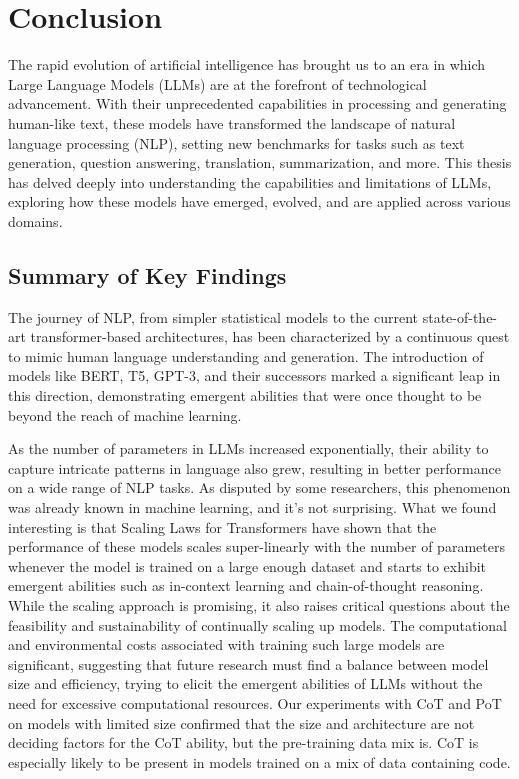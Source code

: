 
\section{Conclusion}
The rapid evolution of artificial intelligence has brought us to an era in which Large Language Models (LLMs) are at the forefront of technological advancement.
With their unprecedented capabilities in processing and generating human-like text, these models have transformed the landscape of natural language processing (NLP), setting new benchmarks for tasks such as text generation, question answering, translation, summarization, and more.
This thesis has delved deeply into understanding the capabilities and limitations of LLMs, exploring how these models have emerged, evolved, and are applied across various domains.

\subsection*{Summary of Key Findings}
The journey of NLP, from simpler statistical models to the current state-of-the-art transformer-based architectures, has been characterized by a continuous quest to mimic human language understanding and generation.
The introduction of models like BERT, T5, GPT-3, and their successors marked a significant leap in this direction, demonstrating emergent abilities that were once thought to be beyond the reach of machine learning.

As the number of parameters in LLMs increased exponentially, their ability to capture intricate patterns in language also grew, resulting in better performance on a wide range of NLP tasks.
As disputed by some researchers, this phenomenon was already known in machine learning, and it's not surprising.
What we found interesting is that Scaling Laws for Transformers have shown that the performance of these models scales super-linearly with the number of parameters whenever the model is trained on a large enough dataset and starts to exhibit emergent abilities such as in-context learning and chain-of-thought reasoning.
While the scaling approach is promising, it also raises critical questions about the feasibility and sustainability of continually scaling up models.
The computational and environmental costs associated with training such large models are significant, suggesting that future research must find a balance between model size and efficiency, trying to elicit the emergent abilities of LLMs without the need for excessive computational resources.
Our experiments with CoT and PoT on models with limited size confirmed that the size and architecture are not deciding factors for the CoT ability, but the pre-training data mix is.
CoT is especially likely to be present in models trained on a mix of data containing code.

